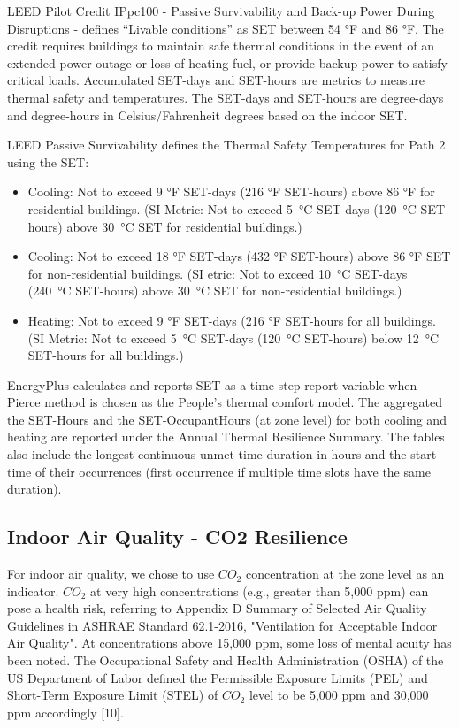 LEED Pilot Credit IPpc100 - Passive Survivability and Back-up Power During Disruptions - defines “Livable conditions” as SET between 54 °F and 86 °F. The credit requires buildings to maintain safe thermal conditions in the event of an extended power outage or loss of heating fuel, or provide backup power to satisfy critical loads. Accumulated SET-days and SET-hours are metrics to measure thermal safety and temperatures. The SET-days and SET-hours are degree-days and degree-hours in Celsius/Fahrenheit degrees based on the indoor SET.

LEED Passive Survivability defines the Thermal Safety Temperatures for Path 2 using the SET:

\begin{itemize}
\item Cooling: Not to exceed 9 °F SET-days (216 °F SET-hours) above 86 °F for residential buildings. (SI Metric: Not to exceed \SI{5}{\celsius} SET-days (\SI{120}{\celsius} SET-hours) above \SI{30}{\celsius} SET for residential buildings.)
\item Cooling: Not to exceed 18 °F SET-days (432 °F SET-hours) above 86 °F SET for non-residential buildings. (SI etric: Not to exceed \SI{10}{\celsius} SET-days (\SI{240}{\celsius} SET-hours) above \SI{30}{\celsius} SET for non-residential buildings.)
\item Heating: Not to exceed 9 °F SET-days (216 °F SET-hours for all buildings. (SI Metric: Not to exceed \SI{5}{\celsius} SET-days (\SI{120}{\celsius} SET-hours) below \SI{12}{\celsius} SET-hours for all buildings.)
\end{itemize}

EnergyPlus calculates and reports SET as a time-step report variable when Pierce method is chosen as the People's thermal comfort model. The aggregated the SET-Hours and the SET-OccupantHours (at zone level) for both cooling and heating are reported under the Annual Thermal Resilience Summary. The tables also include the longest continuous unmet time duration in hours and the start time of their occurrences (first occurrence if multiple time slots have the same duration).


\subsection{Indoor Air Quality - CO2 Resilience}\label{indoor-air-quality-resilience}

For indoor air quality, we chose to use $CO_2$ concentration at the zone level as an indicator. $CO_2$ at very high concentrations (e.g., greater than 5,000 ppm) can pose a health risk, referring to Appendix D Summary of Selected Air Quality Guidelines in ASHRAE Standard 62.1-2016, "Ventilation for Acceptable Indoor Air Quality". At concentrations above 15,000 ppm, some loss of mental acuity has been noted. The Occupational Safety and Health Administration (OSHA) of the US Department of Labor defined the Permissible Exposure Limits (PEL) and Short-Term Exposure Limit (STEL) of $CO_2$ level to be 5,000 ppm and 30,000 ppm accordingly [10].


